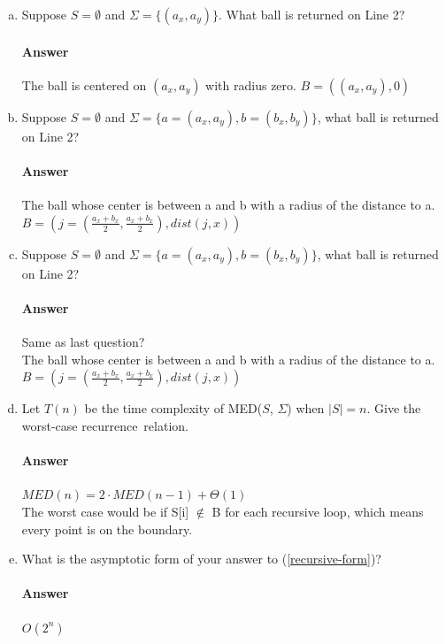 \documentclass{article}
\begin{document}
\begin{enumerate}[(a)]
    \item
        Suppose $S=\emptyset$ and $\Sigma=\{ (a_x,a_y)\}$. What ball is returned on Line 2?
        \paragraph{Answer} The ball is centered on $(a_x,a_y)$ with radius zero. $B = ((a_x,a_y), 0)$
    \item
        Suppose $S=\emptyset$ and $\Sigma=\{ a=(a_x,a_y),b=(b_x,b_y)\}$, what ball is returned on Line 2?
        \paragraph{Answer}
        The ball whose center is between a and b with a radius of the distance to a.\\
        $B = (j = (\frac{a_x + b_x}{2},\frac{a_x + b_x}{2}), dist(j, x))$
    \item
        Suppose $S=\emptyset$ and $\Sigma=\{ a=(a_x,a_y),b=(b_x,b_y)\}$, what ball is returned on Line 2?
        \paragraph{Answer}
        Same as last question?\\
        The ball whose center is between a and b with a radius of the distance to a.\\
        $B = (j = (\frac{a_x + b_x}{2},\frac{a_x + b_x}{2}), dist(j, x))$
    \item Let $T(n)$ be the time complexity of MED($S$, $\Sigma$) when
        $|S|=n$.  Give the worst-case recurrence~relation.\label{recursive-form}
        \paragraph{Answer} $MED(n) = 2 \cdot MED(n-1) + \Theta(1)$\\
        The worst case would be if S[i] $\notin$ B for each recursive loop, which means every point is on the boundary.
    \item What is the asymptotic form of your answer to (\ref{recursive-form})?
        \paragraph{Answer} $O(2^n)$
\end{enumerate}
\end{document}
